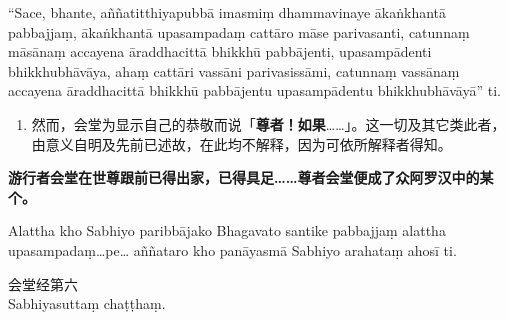 “Sace, bhante, aññatitthiyapubbā imasmiṃ dhammavinaye ākaṅkhantā pabbajjaṃ, ākaṅkhantā upasampadaṃ cattāro māse parivasanti, catunnaṃ māsānaṃ accayena āraddhacittā bhikkhū pabbājenti, upasampādenti bhikkhubhāvāya, ahaṃ cattāri vassāni parivasissāmi, catunnaṃ vassānaṃ accayena āraddhacittā bhikkhū pabbājentu upasampādentu bhikkhubhāvāyā” ti.

\begin{enumerate}\item 然而，会堂为显示自己的恭敬而说「\textbf{尊者！如果}……」。这一切及其它类此者，由意义自明及先前已述故，在此均不解释，因为可依所解释者得知。\end{enumerate}

\textbf{游行者会堂在世尊跟前已得出家，已得具足……尊者会堂便成了众阿罗汉中的某个。}

Alattha kho Sabhiyo paribbājako Bhagavato santike pabbajjaṃ alattha upasampadaṃ…pe… aññataro kho panāyasmā Sabhiyo arahataṃ ahosī ti.

\begin{center}\vspace{1em}会堂经第六\\Sabhiyasuttaṃ chaṭṭhaṃ.\end{center}